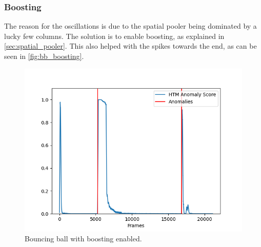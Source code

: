 \subsubsection{Boosting}
The reason for the oscillations is due to the spatial pooler being dominated by a lucky few columns. The solution is to enable boosting, as explained in \autoref{sec:spatial_pooler}. This also helped with the spikes towards the end, as can be seen in \autoref{fig:bb_boosting}.\par
\begin{figure}[H]
    \centering
    \includegraphics[width=\textwidth]{resources/experiments/bouncing_ball/bb_anoms_boosting.png}
    \caption{Bouncing ball with boosting enabled.}
    \label{fig:bb_boosting}
\end{figure}
